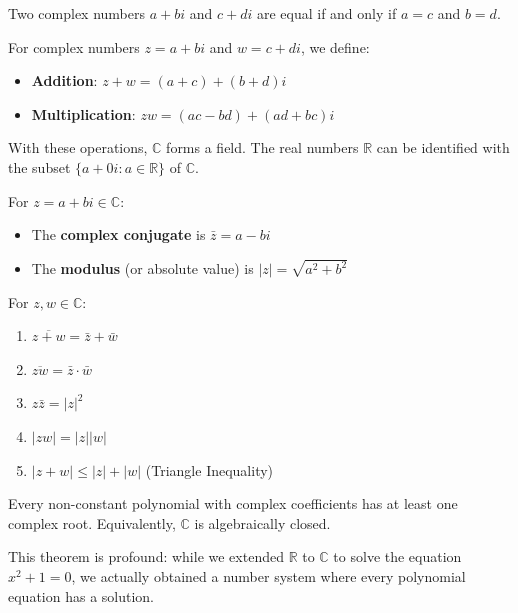 \documentclass[oneside]{book}
\begin{document}
Two complex numbers $a + bi$ and $c + di$ are equal if and only if $a = c$ and $b = d$.

\begin{definition}
For complex numbers $z = a + bi$ and $w = c + di$, we define:
\begin{itemize}
    \item \textbf{Addition}: $z + w = (a + c) + (b + d)i$
    \item \textbf{Multiplication}: $zw = (ac - bd) + (ad + bc)i$
\end{itemize}
\end{definition}

With these operations, $\mathbb{C}$ forms a field. The real numbers $\mathbb{R}$ can be identified with the subset $\{a + 0i : a \in \mathbb{R}\}$ of $\mathbb{C}$.

\begin{definition}
For $z = a + bi \in \mathbb{C}$:
\begin{itemize}
    \item The \textbf{complex conjugate} is $\bar{z} = a - bi$
    \item The \textbf{modulus} (or absolute value) is $|z| = \sqrt{a^2 + b^2}$
\end{itemize}
\end{definition}

\begin{theorem}
For $z, w \in \mathbb{C}$:
\begin{enumerate}
    \item $\overline{z + w} = \bar{z} + \bar{w}$
    \item $\overline{zw} = \bar{z} \cdot \bar{w}$
    \item $z\bar{z} = |z|^2$
    \item $|zw| = |z||w|$
    \item $|z + w| \le |z| + |w|$ (Triangle Inequality)
\end{enumerate}
\end{theorem}

\begin{theorem}
Every non-constant polynomial with complex coefficients has at least one complex root. Equivalently, $\mathbb{C}$ is algebraically closed.
\end{theorem}

This theorem is profound: while we extended $\mathbb{R}$ to $\mathbb{C}$ to solve the equation $x^2 + 1 = 0$, we actually obtained a number system where every polynomial equation has a solution.
\end{document}
